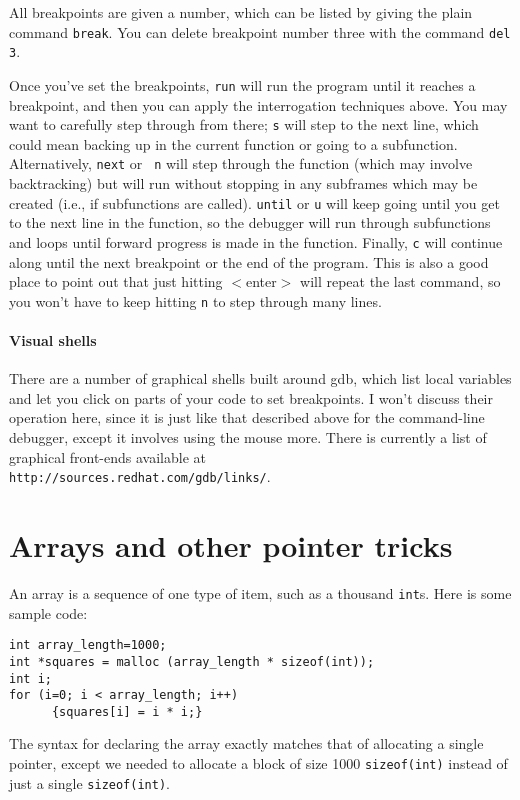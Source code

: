 \documentclass[12pt]{article}
\begin{document}
All breakpoints are given a number, which can be listed by giving the
plain command {\tt break}. You can delete breakpoint number three with
the command {\tt del 3}.

Once you've set the breakpoints, {\tt run} will run the program until it
reaches a breakpoint, and then you can apply the interrogation techniques
above. You may want to carefully step through from there; {\tt s}
will step to the next line, which could mean backing up in the current
function or going to a subfunction. Alternatively, {\tt next} or {\tt
n} will step through the function (which may involve backtracking) but
will run without stopping in any subframes which may be created
(i.e., if subfunctions are called).  {\tt until} or {\tt u} will keep
going until you get to the next line in the function, so the debugger
will run through subfunctions and loops until forward progress is made
in the function.  Finally, {\tt c} will continue along until the next
breakpoint or the end of the program. This is also a good place to
point out that just hitting $<$enter$>$ will repeat the last command,
so you won't have to keep hitting {\tt n} to step through many lines.


\paragraph{Visual shells} There are a number of graphical shells built
around gdb, which list local variables and let you click on parts of
your code to set breakpoints. I won't discuss their operation here, since 
it is just like that described above for the command-line debugger, except
it involves using the mouse more. There is currently a list of graphical
front-ends available at\\ {\tt http://sources.redhat.com/gdb/links/}.

\section{Arrays and other pointer tricks} \label{for_loops} 

An array is a sequence of one type of item, such as a thousand {\tt int}s. Here is some sample code:
\begin{verbatim}
int array_length=1000;
int *squares = malloc (array_length * sizeof(int));
int i;
for (i=0; i < array_length; i++)
      {squares[i] = i * i;}
\end{verbatim}
The syntax for declaring the array exactly matches that of allocating
a single pointer, except we needed to allocate a block of size 1000
{\tt * sizeof(int)} instead of just a single {\tt sizeof(int)}. 
\end{document}
